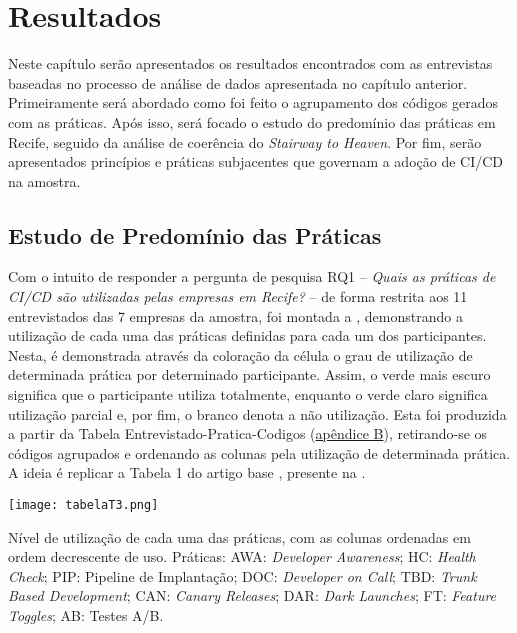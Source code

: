 
\chapter{Resultados}

Neste capítulo serão apresentados os resultados encontrados com as entrevistas baseadas no processo de análise de dados apresentada no capítulo anterior. Primeiramente será abordado como foi feito o agrupamento dos códigos gerados com as práticas. Após isso, será focado o estudo do predomínio das práticas em Recife, seguido da análise de coerência do \emph{Stairway to Heaven}. Por fim, serão apresentados princípios e práticas subjacentes que governam a adoção de CI/CD na amostra.


\section{Estudo de Predomínio das Práticas}

Com o intuito de responder a pergunta de pesquisa RQ1 -- \emph{Quais as práticas de CI/CD são utilizadas pelas empresas em Recife?} -- de forma restrita aos 11 entrevistados das 7 empresas da amostra, foi montada a , demonstrando a utilização de cada uma das práticas definidas para cada um dos participantes. Nesta, é demonstrada através da coloração da célula o grau de utilização de determinada prática por determinado participante. Assim, o verde mais escuro significa que o participante utiliza totalmente, enquanto o verde claro significa utilização parcial e, por fim, o branco denota a não utilização. Esta foi produzida a partir da Tabela Entrevistado-Pratica-Codigos (\hyperlink{tabela1}{apêndice B}), retirando-se os códigos agrupados e ordenando as colunas pela utilização de determinada prática. A ideia é replicar a Tabela 1 do artigo base \cite{empiricalStudy2016}, presente na .

\begin{table}[ht]
\begin{center}
\texttt{[image: tabelaT3.png]}
\end{center}
\caption[Nível de utilização das práticas, com as colunas em ordem decrescente de uso]{
    Nível de utilização de cada uma das práticas, com as colunas ordenadas em ordem decrescente de uso. Práticas: AWA: \emph{Developer Awareness}; HC: \emph{Health Check}; PIP: Pipeline de Implantação; DOC: \emph{Developer on Call}; TBD: \emph{Trunk Based Development}; CAN: \emph{Canary Releases}; DAR: \emph{Dark Launches}; FT: \emph{Feature Toggles}; AB: Testes A/B.
}\label{tabela_t3}
\end{table}

